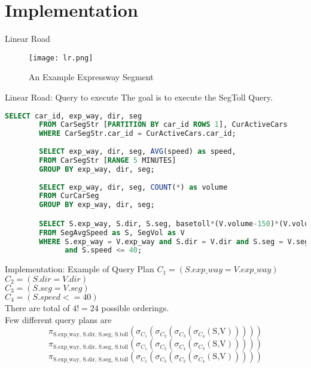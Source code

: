 
\section{Implementation }
\frame{\sectionpage}

\begin{frame}{Linear Road}
    \begin{figure}
        \centering
        \texttt{[image: lr.png]}\\
        \caption{An Example Expressway Segment}
        \label{fig:lr_ex}
    \end{figure}
\end{frame}

\begin{frame}[fragile]{Linear Road: Query to execute}
    The goal is to execute the SegToll Query.
    \begin{lstlisting}[language=SQL, caption= SEGTOLL linear road query]
        SELECT car_id, exp_way, dir, seg
        FROM CarSegStr [PARTITION BY car_id ROWS 1], CurActiveCars
        WHERE CarSegStr.car_id = CurActiveCars.car_id;
        
        SELECT exp_way, dir, seg, AVG(speed) as speed,
        FROM CarSegStr [RANGE 5 MINUTES]
        GROUP BY exp_way, dir, seg;
        
        SELECT exp_way, dir, seg, COUNT(*) as volume
        FROM CurCarSeg
        GROUP BY exp_way, dir, seg;

        SELECT S.exp_way, S.dir, S.seg, basetoll*(V.volume-150)*(V.volume-150)
        FROM SegAvgSpeed as S, SegVol as V
        WHERE S.exp_way = V.exp_way and S.dir = V.dir and S.seg = V.seg
              and S.speed <= 40;
    \end{lstlisting}
\end{frame}

\begin{frame}{Implementation: Example of Query Plan}
$C_1=(S.exp\_way = V.exp\_way)$\\
$C_2=(S.dir = V.dir)$\\
$C_3=(S.seg = V.seg)$\\
$C_4=(S.speed <= 40)$\\
There are total of $4!=24$ possible orderings.\\
Few different query plans are
$$\pi_{\text{S.exp\_way, S.dir, S.seg, S.toll}}(\sigma_{C_1}(\sigma_{C_2}(\sigma_{C_3}(\sigma_{C_4}(\text{S,V})))))$$
$$\pi_{\text{S.exp\_way, S.dir, S.seg, S.toll}}(\sigma_{C_1}(\sigma_{C_2}(\sigma_{C_4}(\sigma_{C_3}(\text{S,V})))))$$
$$\pi_{\text{S.exp\_way, S.dir, S.seg, S.toll}}(\sigma_{C_1}(\sigma_{C_3}(\sigma_{C_2}(\sigma_{C_4}(\text{S,V})))))$$

\end{frame}

